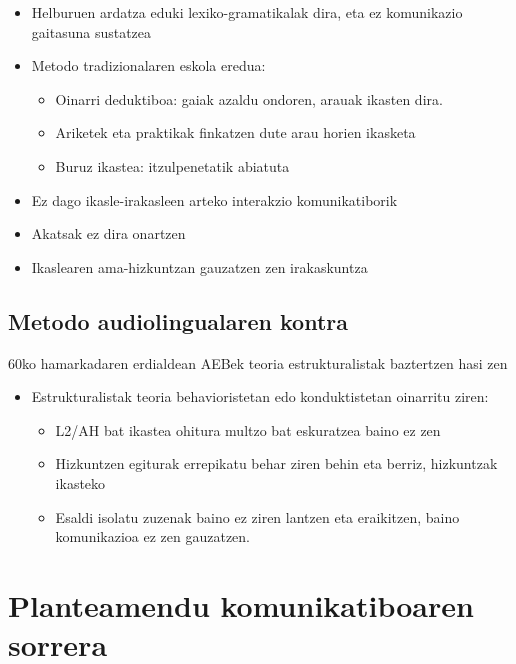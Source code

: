 \documentclass[
]{book}
\providecommand{\tightlist}{%
  \setlength{\itemsep}{0pt}\setlength{\parskip}{0pt}}
\begin{document}
\begin{itemize}
\tightlist
\item
  Helburuen ardatza eduki lexiko-gramatikalak dira, eta ez komunikazio gaitasuna sustatzea
\item
  Metodo tradizionalaren eskola eredua:

  \begin{itemize}
  \tightlist
  \item
    Oinarri deduktiboa: gaiak azaldu ondoren, arauak ikasten dira.
  \item
    Ariketek eta praktikak finkatzen dute arau horien ikasketa
  \item
    Buruz ikastea: itzulpenetatik abiatuta
  \end{itemize}
\item
  Ez dago ikasle-irakasleen arteko interakzio komunikatiborik
\item
  Akatsak ez dira onartzen
\item
  Ikaslearen ama-hizkuntzan gauzatzen zen irakaskuntza
\end{itemize}

\hypertarget{metodo-audiolingualaren-kontra}{%
\section{Metodo audiolingualaren kontra}\label{metodo-audiolingualaren-kontra}}

60ko hamarkadaren erdialdean AEBek teoria estrukturalistak baztertzen hasi zen

\begin{itemize}
\tightlist
\item
  Estrukturalistak teoria behavioristetan edo konduktistetan oinarritu ziren:

  \begin{itemize}
  \tightlist
  \item
    L2/AH bat ikastea ohitura multzo bat eskuratzea baino ez zen
  \item
    Hizkuntzen egiturak errepikatu behar ziren behin eta berriz, hizkuntzak ikasteko
  \item
    Esaldi isolatu zuzenak baino ez ziren lantzen eta eraikitzen, baino komunikazioa ez zen gauzatzen.
  \end{itemize}
\end{itemize}

\hypertarget{planteamendu-komunikatiboaren-sorrera-1}{%
\chapter{Planteamendu komunikatiboaren sorrera}\label{planteamendu-komunikatiboaren-sorrera-1}}
\end{document}
